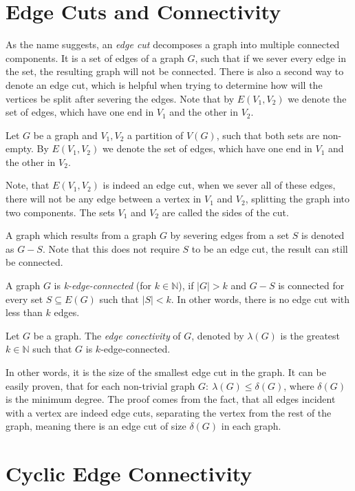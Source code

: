 \documentclass[12pt, twoside]{book}
\begin{document}
\section{Edge Cuts and Connectivity}\label{sec:edge-cuts}

As the name suggests, an \textit{edge cut} decomposes a graph into multiple connected components. It is a set of edges of a graph $G$, such that if we sever every edge in the set, the resulting graph will not be connected. There is also a second way to denote an edge cut, which is helpful when trying to determine how will the vertices be split after severing the edges. Note that by $E(V_1,V_2)$ we denote the set of edges, which have one end in $V_1$ and the other in $V_2$.

Let $G$ be a graph and ${V_1,V_2}$ a partition of $V(G)$, such that both sets are non-empty. By $E(V_1,V_2)$ we denote the set of edges, which have one end in $V_1$ and the other in $V_2$.

Note, that $E(V_1,V_2)$ is indeed an edge cut, when we sever all of these edges, there will not be any edge between a vertex in $V_1$ and $V_2$, splitting the graph into two components. The sets $V_1$ and $V_2$ are called the sides of the cut.

A graph which results from a graph $G$ by severing edges from a set $S$ is denoted as $G-S$. Note that this does not require $S$ to be an edge cut, the result can still be connected.

A graph $G$ is \textit{k-edge-connected} (for $k\in\mathbb{N}$), if $|G|>k$ and $G-S$ is connected for every set $S\subseteq E(G)$ such that $|S|<k$. In other words, there is no edge cut with less than $k$ edges.

\begin{definition}
	Let $G$ be a graph. The \textit{edge conectivity} of $G$, denoted by $\lambda(G)$ is the greatest $k\in\mathbb{N}$ such that $G$ is $k$-edge-connected.
\end{definition}

In other words, it is the size of the smallest edge cut in the graph. It can be easily proven, that for each non-trivial graph $G:~\lambda(G)\leq\delta(G)$, where $\delta(G)$ is the minimum degree. The proof comes from the fact, that all edges incident with a vertex are indeed edge cuts, separating the vertex from the rest of the graph, meaning there is an edge cut of size $\delta(G)$ in each graph.

\section{Cyclic Edge Connectivity}\label{sec:cyclic-edge-connectivity}
\end{document}
